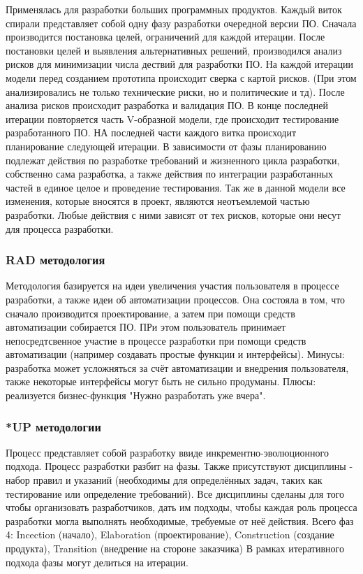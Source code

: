 Применялась для разработки больших программных продуктов.
Каждый виток спирали представляет собой одну фазу разработки очередной версии ПО. Сначала производится постановка целей, ограничений для каждой итерации. 
После постановки целей и выявления альтернативных решений, производился анализ рисков для минимизации числа дествий для разработки ПО. На каждой итерации модели перед созданием прототипа происходит сверка с картой рисков.
(При этом анализировались не только технические риски, но и политические и тд). После анализа рисков происходит разработка и валидация ПО. В конце последней итерации повторяется часть V-образной модели, где происходит тестирование разработанного ПО.
НА последней части каждого витка происходит планирование следующей итерации. 
В зависимости от фазы планированию подлежат действия по разработке требований и жизненного цикла разработки, собственно сама разработка, а также действия по интеграции
разработанных частей в единое целое и проведение тестирования.
Так же в данной модели все изменения, которые вносятся в проект, являются неотъемлемой частью разработки. Любые действия с ними зависят от тех рисков, которые они несут для процесса разработки.

\subsubsection{RAD методология}

Методология базируется на идеи увеличения участия пользователя в процессе разработки, а также идеи об автоматизации процессов. Она состояла в том, что сначало производится проектирование, а затем при помощи средств автоматизации собирается ПО. ПРи этом пользователь принимает непосредтсвенное участие в процессе разработки при помощи средств автоматизации (например создавать простые функции и интерфейсы).
Минусы: разработка может усложняться за счёт автоматизации и внедрения пользователя, также некоторые интерфейсы могут быть не сильно продуманы. Плюсы: реализуется бизнес-функция "Нужно разработать уже вчера".

\subsubsection{*UP методологии}

Процесс представляет собой разработку ввиде инкрементно-эволюционного подхода. Процесс разработки разбит на фазы. Также присутствуют дисциплины - набор правил и указаний (необходимы для определённых задач, таких как тестирование или определение требований).
Все дисциплины сделаны для того чтобы организовать разработчиков, дать им подходы, чтобы каждая роль процесса разработки могла выполнять необходимые, требуемые от неё действия.
Всего фаз 4: Incection (начало), Elaboration (проектирование), Construction (создание продукта), Transition (внедрение на стороне заказчика)
В рамках итеративного подхода фазы могут делиться на итерации.